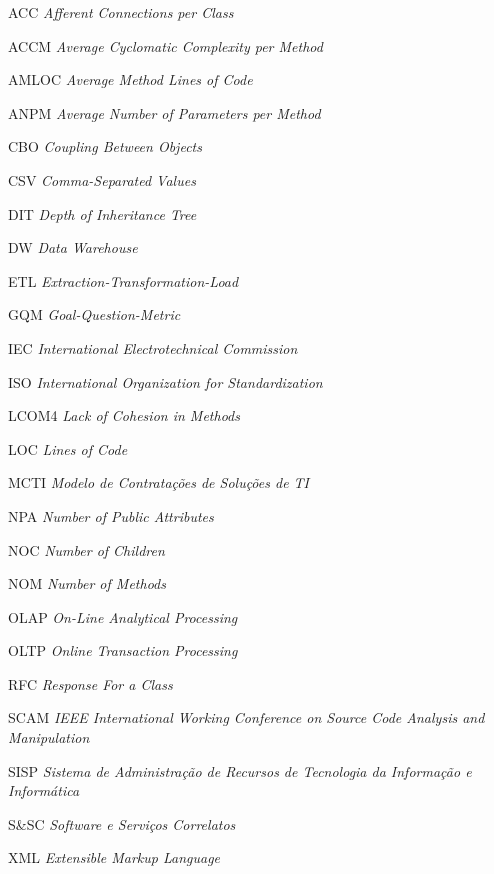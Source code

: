 \begin{siglas}
\item [ACC]   \textit{Afferent Connections per Class}
\item [ACCM]  \textit{Average Cyclomatic Complexity per Method}
\item [AMLOC] \textit{Average Method Lines of Code}
\item [ANPM]  \textit{Average Number of Parameters per Method}
\item [CBO]   \textit{Coupling Between Objects}
\item [CSV]   \textit{Comma-Separated Values}
\item [DIT]	  \textit{Depth of Inheritance Tree}
\item [DW]	  \textit{Data Warehouse}
\item [ETL]   \textit{Extraction-Transformation-Load}
\item [GQM]   \textit{Goal-Question-Metric}
\item [IEC]   \textit{International Electrotechnical Commission}
\item [ISO]   \textit{International Organization for Standardization}
\item [LCOM4] \textit{Lack of Cohesion in Methods}
\item [LOC]   \textit{Lines of Code}
\item [MCTI]   \textit{Modelo de Contratações de Soluções de TI}
\item [NPA]   \textit{Number of Public Attributes}
\item [NOC]   \textit{Number of Children}
\item [NOM]   \textit{Number of Methods}
\item [OLAP]  \textit{On-Line Analytical Processing}
\item [OLTP]  \textit{Online Transaction Processing}
\item [RFC]   \textit{Response For a Class}
\item [SCAM]  \textit{IEEE International Working Conference on Source Code Analysis and Manipulation}
\item [SISP]   \textit{Sistema de Administração de Recursos de Tecnologia da Informação e Informática}
\item [S\&SC]   \textit{Software e Serviços Correlatos} 
\item [XML]    \textit{Extensible Markup Language}
\end{siglas}
